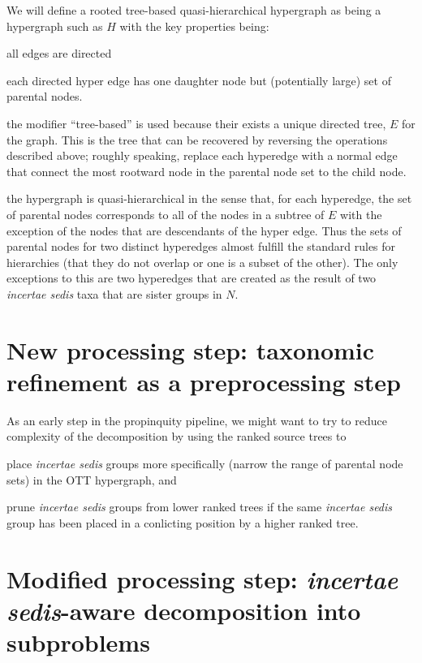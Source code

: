 \documentclass[11pt]{article}
\newcommand{\insed}{{\em incertae sedis}\xspace}
\newcommand{\specialHypergraph}{rooted tree-based quasi-hierarchical hypergraph \xspace}
\newcommand{\naiveFullTree}{\ensuremath{N}\xspace}
\newcommand{\augmentedFullTree}{\ensuremath{E}\xspace}
\begin{document}
We will define a \specialHypergraph as being a hypergraph such as $H$ with the key properties being:
\begin{compactitem}
    \item all edges are directed
    \item each directed hyper edge has one daughter node but (potentially large) set of parental nodes.
    \item the modifier ``tree-based'' is used because their exists a unique directed tree,
    $\augmentedFullTree$ for the graph. This is the tree that can be recovered by reversing the 
    operations described above; roughly speaking, replace each hyperedge with a normal edge that connect 
    the most rootward node in the parental node set to the child node.
    \item the hypergraph is quasi-hierarchical in the sense that, for each hyperedge, the set of parental
        nodes corresponds to all of the nodes in a subtree of $E$ with the exception of the nodes
        that are descendants of the hyper edge.
        Thus the sets of parental nodes for two distinct hyperedges almost fulfill the standard
        rules for hierarchies (that they do not overlap or one is a subset of the other).
        The only exceptions to this are two hyperedges that are created as the result of two 
        \insed taxa that are sister groups in \naiveFullTree.
\end{compactitem}

\section{New processing step: taxonomic refinement as a preprocessing step}
As an early step in the propinquity pipeline, we might want to try to reduce complexity of the
    decomposition by using the ranked source trees to
\begin{compactenum}
    \item place \insed groups more specifically (narrow the range of parental node sets) in the OTT hypergraph, and
    \item prune \insed groups from lower ranked trees if the same \insed group has been placed in a 
        conlicting position by a higher ranked tree.
\end{compactenum}

\section{Modified processing step: \insed-aware decomposition into subproblems}
\end{document}

